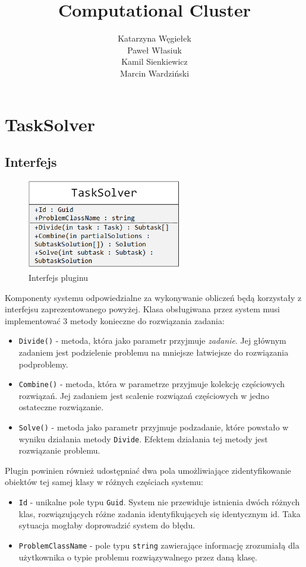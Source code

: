 \documentclass[12pt,a4paper,titlepage]{report}
\author{Katarzyna Węgiełek \\ Paweł Własiuk \\ Kamil Sienkiewicz\\ Marcin Wardziński}
\title{\textbf{Computational Cluster}}
\begin{document}
	\maketitle
	\tableofcontents

	\chapter{TaskSolver}
		\section{Interfejs}	
	\begin{figure}[h]
		\centering
		\caption{Interfejs pluginu}
		\includegraphics[width=0.6\textwidth]{img/taskSolverInterface.png}
	\end{figure}
	
	Komponenty systemu odpowiedzialne za wykonywanie obliczeń będą korzystały z interfejsu zaprezentowanego powyżej.
	Klasa obsługiwana przez system musi implementować 3 metody konieczne do rozwiązania zadania:
	\begin{itemize}
		\item \verb+Divide()+ - metoda, która jako parametr przyjmuje \textit{zadanie}. Jej głównym zadaniem jest podzielenie problemu
		na mniejsze łatwiejsze do rozwiązania podproblemy.
		\item \verb+Combine()+ - metoda, która w parametrze przyjmuje kolekcję częściowych rozwiązań. Jej zadaniem jest scalenie rozwiązań częściowych w jedno ostateczne rozwiązanie.
		\item \verb+Solve()+ - metoda jako parametr przyjmuje podzadanie, które powstało w wyniku działania metody \verb+Divide+. 
		Efektem działania tej metody jest rozwiązanie problemu.
	\end{itemize}		
	
	Plugin powinien również udostępniać dwa pola umożliwiające zidentyfikowanie obiektów tej samej klasy w różnych częściach systemu:
	\begin{itemize}
		\item \verb+Id+ - unikalne pole typu \verb+Guid+. System nie przewiduje istnienia dwóch różnych klas, rozwiązujących różne zadania identyfikujących się identycznym id. Taka sytuacja mogłaby doprowadzić system do błędu.
		\item \verb+ProblemClassName+ - pole typu \verb+string+ zawierające informację zrozumiałą dla użytkownika o typie problemu rozwiązywalnego przez daną klasę.
	\end{itemize}		
\end{document}
